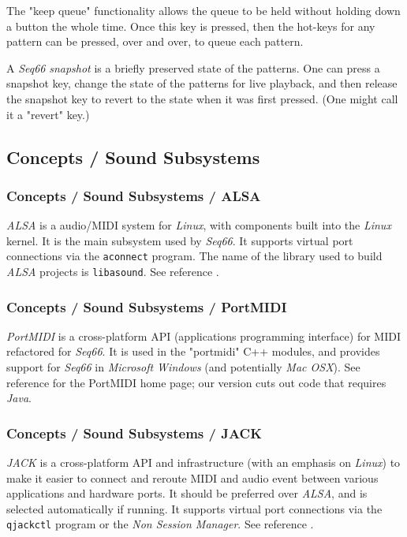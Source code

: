    The "keep queue" functionality allows the queue to be held without
   holding down a button the whole time.  Once this key is pressed,
   then the hot-keys for any pattern can be pressed, over and over,
   to queue each pattern.

   A \textsl{Seq66} \textsl{snapshot} is a briefly preserved
   state of the patterns.  One can press a snapshot key, change the state of
   the patterns for live playback, and then release the snapshot key to
   revert to the state when it was first pressed.  (One might call it a
   "revert" key.)

\subsection{Concepts / Sound Subsystems}
\label{subsec:concepts_sound_subsystems}

\subsubsection{Concepts / Sound Subsystems / ALSA}
\label{subsubsec:concepts_sound_alsa}

   \textsl{ALSA} is a audio/MIDI system for \textsl{Linux}, with components built
   into the \textsl{Linux} kernel. It is the main subsystem used by
   \textsl{Seq66}.
   It supports virtual port connections via the \texttt{aconnect} program.
   The name of the library used to build
   \textsl{ALSA} projects is \texttt{libasound}.
   See reference \cite{alsa}.

\subsubsection{Concepts / Sound Subsystems / PortMIDI}
\label{subsubsec:concepts_sound_portmidi}

   \textsl{PortMIDI} is a cross-platform API (applications programming
   interface) for MIDI refactored for \textsl{Seq66}.
   It is used in the "portmidi" C++ modules, and provides support for
   \textsl{Seq66} in \textsl{Microsoft Windows} (and potentially
   \textsl{Mac OSX}).
   See reference \cite{portmidi} for the PortMIDI home page; our version
   cuts out code that requires \textsl{Java}.

\subsubsection{Concepts / Sound Subsystems / JACK}
\label{subsubsec:concepts_sound_jack}

   \textsl{JACK} is a cross-platform
   API and infrastructure
   (with an emphasis on \textsl{Linux})
   to make it easier to connect and reroute MIDI
   and audio event between various applications and hardware ports.
   It should be preferred over \textsl{ALSA}, and is selected automatically if
   running.
   It supports virtual port connections via the \texttt{qjackctl} program or
   the \textsl{Non Session Manager}.
   See reference \cite{jack}.


